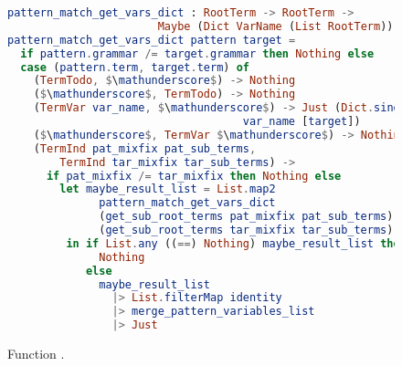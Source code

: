 \documentclass[master.tex]{subfiles}
\begin{document}
\begin{figure}[H]
\begin{framed}
\begin{lstlisting}[language=elm]
pattern_match_get_vars_dict : RootTerm -> RootTerm ->
                       Maybe (Dict VarName (List RootTerm))
pattern_match_get_vars_dict pattern target =
  if pattern.grammar /= target.grammar then Nothing else
  case (pattern.term, target.term) of
    (TermTodo, $\mathunderscore$) -> Nothing
    ($\mathunderscore$, TermTodo) -> Nothing
    (TermVar var_name, $\mathunderscore$) -> Just (Dict.singleton
                                    var_name [target])
    ($\mathunderscore$, TermVar $\mathunderscore$) -> Nothing
    (TermInd pat_mixfix pat_sub_terms,
        TermInd tar_mixfix tar_sub_terms) ->
      if pat_mixfix /= tar_mixfix then Nothing else
        let maybe_result_list = List.map2
              pattern_match_get_vars_dict
              (get_sub_root_terms pat_mixfix pat_sub_terms)
              (get_sub_root_terms tar_mixfix tar_sub_terms)
         in if List.any ((==) Nothing) maybe_result_list then
              Nothing
            else
              maybe_result_list
                |> List.filterMap identity
                |> merge_pattern_variables_list
                |> Just
\end{lstlisting}
\end{framed}
\caption{Function .}
\label{fig:supp-pattern-pattern-match-get-vars-dict}
\end{figure}
\end{document}
